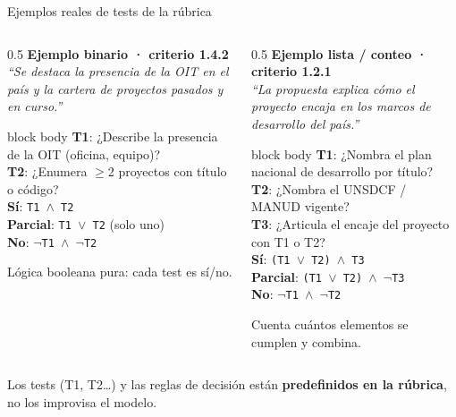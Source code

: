 \documentclass[aspectratio=169,11pt]{beamer}
\newcommand{\redlead}[1]{\textbf{\color{iloRed}#1}}
\newcommand{\bluelead}[1]{\textbf{\color{iloBlue}#1}}
\begin{document}
\begin{frame}{Ejemplos reales de tests de la rúbrica}
  \scriptsize
  \begin{columns}[T]
    \begin{column}{0.5\textwidth}
      \bluelead{Ejemplo binario · criterio 1.4.2}\\[1pt]
      \textit{``Se destaca la presencia de la OIT en el país y la cartera de proyectos pasados y en curso.''}
      \vspace{0.15cm}
      \begin{beamercolorbox}[wd=\textwidth,sep=5pt]{block body}
        \textbf{T1}: ¿Describe la presencia de la OIT (oficina, equipo)?\\
        \textbf{T2}: ¿Enumera $\geq$2 proyectos con título o código?\\[3pt]
        \bluelead{Sí}: \texttt{T1 $\wedge$ T2}\\
        \textbf{Parcial}: \texttt{T1 $\vee$ T2} (solo uno)\\
        \redlead{No}: \texttt{$\neg$T1 $\wedge$ $\neg$T2}
      \end{beamercolorbox}
      \vspace{0.1cm}
      {\color{iloGray}Lógica booleana pura: cada test es sí/no.}
    \end{column}
    \begin{column}{0.5\textwidth}
      \bluelead{Ejemplo lista / conteo · criterio 1.2.1}\\[1pt]
      \textit{``La propuesta explica cómo el proyecto encaja en los marcos de desarrollo del país.''}
      \vspace{0.15cm}
      \begin{beamercolorbox}[wd=\textwidth,sep=5pt]{block body}
        \textbf{T1}: ¿Nombra el plan nacional de desarrollo por título?\\
        \textbf{T2}: ¿Nombra el UNSDCF / MANUD vigente?\\
        \textbf{T3}: ¿Articula el encaje del proyecto con T1 o T2?\\[3pt]
        \bluelead{Sí}: \texttt{(T1 $\vee$ T2) $\wedge$ T3}\\
        \textbf{Parcial}: \texttt{(T1 $\vee$ T2) $\wedge$ $\neg$T3}\\
        \redlead{No}: \texttt{$\neg$T1 $\wedge$ $\neg$T2}
      \end{beamercolorbox}
      \vspace{0.1cm}
      {\color{iloGray}Cuenta cuántos elementos se cumplen y combina.}
    \end{column}
  \end{columns}
  \vspace{0.15cm}
  \centering\footnotesize Los tests (T1, T2\dots) y las reglas de decisión están \bluelead{predefinidos en la rúbrica}, no los improvisa el modelo.
\end{frame}
\end{document}
